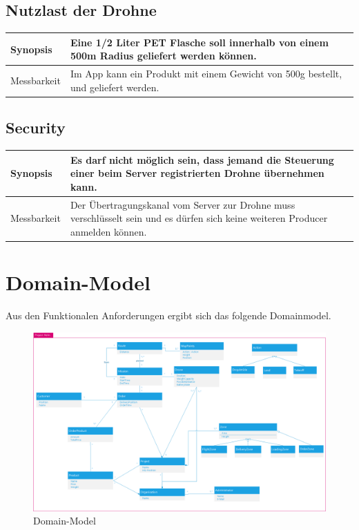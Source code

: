 \subsection{Nutzlast der Drohne}
\begin{tabular}{|p{}|p{}|} \hline
	Synopsis & Eine 1/2 Liter PET Flasche soll innerhalb von einem 500m Radius geliefert werden können. \\ \hline
	Messbarkeit & Im App kann ein Produkt mit einem Gewicht von 500g bestellt, und geliefert werden. \\ \hline
\end{tabular}

\subsection{Security}
\begin{tabular}{|p{}|p{}|} \hline
	Synopsis & Es darf nicht möglich sein, dass jemand die Steuerung einer beim Server registrierten Drohne übernehmen kann.\\ \hline
	Messbarkeit & Der Übertragungskanal vom Server zur Drohne muss verschlüsselt sein und es dürfen sich keine weiteren Producer anmelden können.\\ \hline
\end{tabular}

\section{Domain-Model}

Aus den Funktionalen Anforderungen ergibt sich das folgende Domainmodel.

\begin{figure}[h]
	\includegraphics[width=1.0\textwidth]{images/domainmodell.png}
	\caption{Domain-Model}
	\label{fig:domain-model}
\end{figure}

